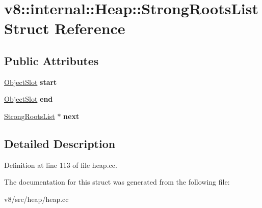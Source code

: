 \hypertarget{structv8_1_1internal_1_1Heap_1_1StrongRootsList}{}\section{v8\+:\+:internal\+:\+:Heap\+:\+:Strong\+Roots\+List Struct Reference}
\label{structv8_1_1internal_1_1Heap_1_1StrongRootsList}
\subsection*{Public Attributes}
\begin{DoxyCompactItemize}
\item 
\mbox{\label{structv8_1_1internal_1_1Heap_1_1StrongRootsList_adb49cb6b28459084ec2f2a6a68d62387}} 
\mbox{\hyperlink{classv8_1_1internal_1_1ObjectSlot}{Object\+Slot}} {\bfseries start}
\item 
\mbox{\label{structv8_1_1internal_1_1Heap_1_1StrongRootsList_a0ab22d4b8d4c1b1f95ca8160e9addd34}} 
\mbox{\hyperlink{classv8_1_1internal_1_1ObjectSlot}{Object\+Slot}} {\bfseries end}
\item 
\mbox{\label{structv8_1_1internal_1_1Heap_1_1StrongRootsList_a4e243194db91e2263c26cbae74d88462}} 
\mbox{\hyperlink{structv8_1_1internal_1_1Heap_1_1StrongRootsList}{Strong\+Roots\+List}} $\ast$ {\bfseries next}
\end{DoxyCompactItemize}


\subsection{Detailed Description}


Definition at line 113 of file heap.\+cc.



The documentation for this struct was generated from the following file\+:\begin{DoxyCompactItemize}
\item 
v8/src/heap/heap.\+cc\end{DoxyCompactItemize}
